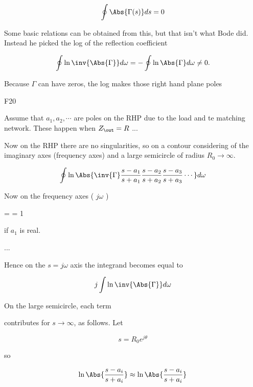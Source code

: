 \begin{equation}\label{eqn:uwavesDeck8ResonatorQfactorCore:n}
\oint \Abs{ \Gamma(s) } ds = 0
\end{equation}

Some basic relations can be obtained from this, but that isn't what Bode did.  Instead he picked the log of the reflection coefficient

\begin{equation}\label{eqn:uwavesDeck8ResonatorQfactorCore:n}
\oint
\ln \inv{\Abs{\Gamma}} d\omega
=
-\oint
\ln \Abs{\Gamma} d\omega
\ne 0.
\end{equation}

Because \( \Gamma \) can have zeros, the log makes those right hand plane poles

F20

Assume that \( a_1, a_2, \cdots \) are poles on the RHP due to the load and te matching network.  These happen when \( Z_\out = R \)
...

Now on the RHP there are no singularities, so on a contour considering of the imaginary axes (frequency axes) and a large semicircle of radius \( R_0 \rightarrow \infty \).

\begin{equation}\label{eqn:uwavesDeck8ResonatorQfactorCore:n}
\oint \ln \Abs{ \inv{\Gamma}
\frac{s - a_1}{s+ a_1}
\frac{s - a_2}{s+ a_2}
\frac{s - a_3}{s+ a_3}
\cdots
} d\omega
\end{equation}

Now on the frequency axes ( \( j \omega \) )

 =
 = 1

if \( a_1 \) is real.

...

Hence on the \( s = j \omega \) axis the integrand becomes equal to

\begin{equation}\label{eqn:uwavesDeck8ResonatorQfactorCore:n}
j \int \ln \inv{\Abs{\Gamma}} d\omega
\end{equation}

On the large semicircle, each term

\ln {} contributes for \( s \rightarrow \infty \), as follows.  Let

\begin{equation}\label{eqn:uwavesDeck8ResonatorQfactorCore:n}
s = R_0 e^{j \theta}
\end{equation}

so

\begin{equation}\label{eqn:uwavesDeck8ResonatorQfactorCore:n}
\ln \Abs{\frac{s - a_i}{s + a_i} }
\approx
\ln \Abs{\frac{s - a_i}{s + a_i} }
\end{equation}
